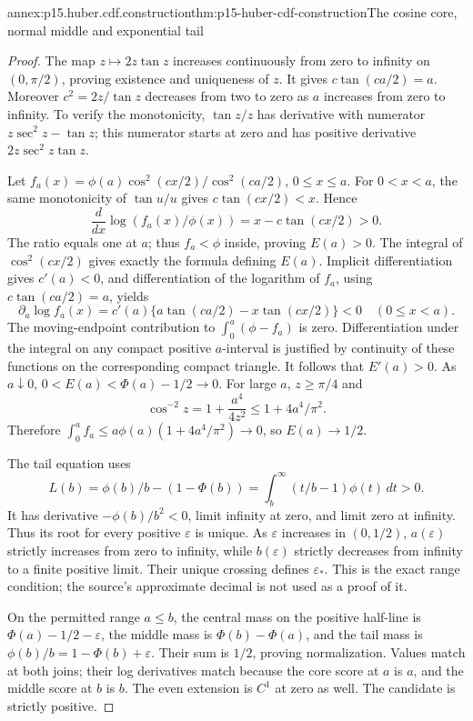 \begin{annexitem}{annex:p15.huber.cdf.construction}{thm:p15-huber-cdf-construction}{The cosine core, normal middle and exponential tail}
\begin{proof}
The map \(z\mapsto2z\tan z\) increases continuously from zero
to infinity on \((0,\pi/2)\), proving existence and uniqueness of
\(z\). It gives \(c\tan(ca/2)=a\).
Moreover \(c^2=2z/\tan z\) decreases from two to zero as \(a\)
increases from zero to infinity. To verify the monotonicity,
\(\tan z/z\) has derivative with numerator
\(z\sec^2z-\tan z\); this numerator starts at zero and has
positive derivative \(2z\sec^2z\tan z\).

Let \(f_a(x)=\phi(a)\cos^2(cx/2)/\cos^2(ca/2)\), \(0\leq x\leq a\).
For \(0<x<a\), the same monotonicity of \(\tan u/u\) gives
\(c\tan(cx/2)<x\). Hence
\[
 \frac{d}{dx}\log(f_a(x)/\phi(x))
       =x-c\tan(cx/2)>0.
\]
The ratio equals one at \(a\); thus \(f_a<\phi\) inside, proving
\(E(a)>0\). The integral of \(\cos^2(cx/2)\) gives exactly the
formula defining \(E(a)\).
Implicit differentiation gives \(c'(a)<0\), and differentiation
of the logarithm of \(f_a\), using \(c\tan(ca/2)=a\), yields
\[
 \partial_a\log f_a(x)
   =c'(a)\{a\tan(ca/2)-x\tan(cx/2)\}<0\quad(0\leq x<a).
\]
The moving-endpoint contribution to
\(\int_0^a(\phi-f_a)\) is zero. Differentiation under the integral
on any compact positive \(a\)-interval is justified by continuity
of these functions on the corresponding compact triangle.
It follows that \(E'(a)>0\).
As \(a\downarrow0\), \(0<E(a)<\Phi(a)-1/2\to0\).
For large \(a\), \(z\geq\pi/4\) and
\[
 \cos^{-2}z=1+\frac{a^4}{4z^2}
       \leq1+4a^4/\pi^2.
\]
Therefore \(\int_0^af_a\leq a\phi(a)(1+4a^4/\pi^2)\to0\),
so \(E(a)\to1/2\).

The tail equation uses
\[
 L(b)=\phi(b)/b-(1-\Phi(b))
     =\int_b^\infty(t/b-1)\phi(t)\,dt>0 .
\]
It has derivative \(-\phi(b)/b^2<0\), limit infinity at zero,
and limit zero at infinity. Thus its root for every positive
\(\varepsilon\) is unique. As \(\varepsilon\) increases in
\((0,1/2)\), \(a(\varepsilon)\) strictly increases from zero
to infinity, while \(b(\varepsilon)\) strictly decreases from
infinity to a finite positive limit. Their unique crossing
defines \(\varepsilon_*\). This is the exact range condition;
the source's approximate decimal is not used as a proof of it.

On the permitted range \(a\leq b\), the central mass on the
positive half-line is \(\Phi(a)-1/2-\varepsilon\), the middle
mass is \(\Phi(b)-\Phi(a)\), and the tail mass is
\(\phi(b)/b=1-\Phi(b)+\varepsilon\).
Their sum is \(1/2\), proving normalization.
Values match at both joins; their log derivatives match because
the core score at \(a\) is \(a\), and the middle score at \(b\)
is \(b\). The even extension is \(C^1\) at zero as well.
The candidate is strictly positive.


\end{proof}
\end{annexitem}
